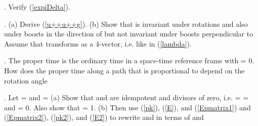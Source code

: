\documentclass[a4paper,12pt]{article}
\begin{document}
\vspace{0.3cm}
. Verify (\ref{expiDelta}).

\vspace{0.3cm}
. (a) Derive (\ref{u++u++g}). (b) Show that \coordHE{} is invariant under rotations and also under boosts in the direction of \coordHE{} but not invariant under boosts perpendicular to \coordHE{} Assume that \myHighlight{$\gamma^{\mu}$}\coordHE{} transforms as a 4-vector, i.e. like \coordHE{} in (\ref{lambda}).

\vspace{0.3cm}
. The proper time \myHighlight{$\tau$}\coordHE{} is the ordinary time \coordHE{} in a space-time reference frame with \coordHE{} = 0. How does the proper time along a path \coordHE{} that is proportional to \coordHE{} depend on the rotation angle \coordHE{}

\vspace{0.3cm}
. Let \coordHE{} = \coordHE{} and \coordHE{} = \coordHE{} (a) Show that \coordHE{} and \coordHE{} are idempotent and divisors of zero, i.e. \coordHE{} = \coordHE{}  \coordHE{} = \coordHE{} and \coordHE{} = 0. Also show that \coordHE{} = 1. (b) Then use   (\ref{pk}), (\ref{E}), and (\ref{Epmatrix1}) and (\ref{Epmatrix2}), (\ref{pk2}), and (\ref{E2}) to rewrite \coordHE{} and \coordHE{} in terms of \coordHE{}  \coordHE{} and \coordHE{}
\end{document}
